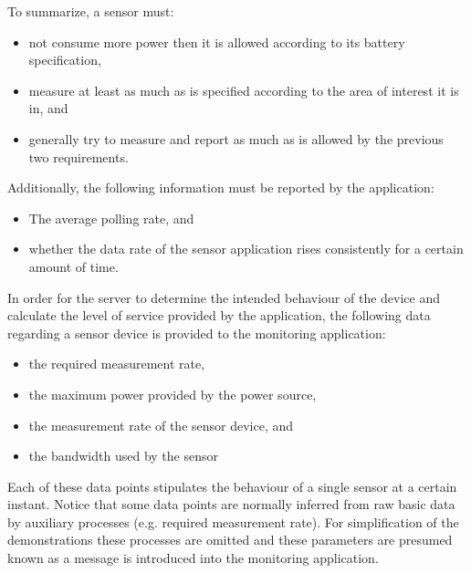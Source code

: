 To summarize, a sensor must:
\begin{itemize}
\nospace
\item not consume more power then it is allowed according to its battery specification,
\item measure at least as much as is specified according to the area of interest it is in, and
\item generally try to measure and report as much as is allowed by the previous two requirements.
\end{itemize}
Additionally, the following information must be reported by the application:
\begin{itemize}
\nospace
\item The average polling rate, and
\item whether the data rate of the sensor application rises consistently for a certain amount of time.
\end{itemize}

In order for the server to determine the intended behaviour of the device and calculate the level of service provided by the application, the following data regarding a sensor device is provided to the monitoring application:
\begin{itemize}
\nospace
\item the required measurement rate,
\item the maximum power provided by the power source,
\item the measurement rate of the sensor device, and
\item the bandwidth used by the sensor
\end{itemize}
Each of these data points stipulates the behaviour of a single sensor at a certain instant. Notice that some data points are normally inferred from raw basic data by auxiliary processes (e.g. required measurement rate). For simplification of the demonstrations these processes are omitted and these parameters are presumed known as a message is introduced into the monitoring application.

